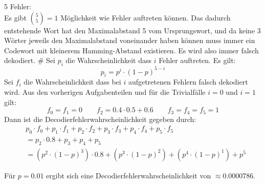 \begin{myList}
5 Fehler:\\
Es gibt $\binom{5}{5} = 1$ Möglichkeit wie Fehler auftreten können.
Das dadurch entstehende Wort hat den Maximalabstand 5 vom Ursprungswort, und da keine 3 Wörter jeweils den Maximalabstand voneinander haben können muss immer ein Codewort mit kleinerem Hamming-Abstand existieren.
Es wird also immer falsch dekodiert.
#
Sei $p_i$ die Wahrscheinlichkeit dass $i$ Fehler auftreten. Es gilt:
\begin{equation*}
	p_i = p^i \cdot (1-p)^{5-i}
\end{equation*}
Sei $f_i$ die Wahrscheinlichkeit dass bei $i$ aufgetretenen Fehlern falsch dekodiert wird. Aus den vorherigen Aufgabenteilen und für die Trivialfälle $i = 0$ und $i = 1$ gilt:
\begin{equation*}
	f_0 = f_1 = 0 \qquad f_2 = 0.4\cdot 0.5 + 0.6 \qquad f_3 = f_4 = f_5 = 1
\end{equation*}
Dann ist die Decodierfehlerwahrscheinlichkeit gegeben durch:
\begin{align*}
	&p_0 \cdot f_0 + p_1 \cdot f_1 + p_2 \cdot f_2 + p_3 \cdot f_3 + p_4 \cdot f_4 + p_5 \cdot f_5 \\
	&= p_2 \cdot 0.8 + p_3  + p_4  + p_5 \\
	&= (p^2 \cdot (1-p)^3) \cdot 0.8 + (p^3 \cdot (1-p)^2) + (p^4 \cdot (1-p)^1) + p^5
\end{align*}

Für $p = 0.01$ ergibt sich eine Decodierfehlerwahrscheinlichkeit von $\approx 0.0000786$.
\end{myList}






